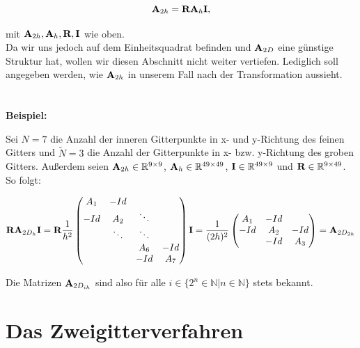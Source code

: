 \begin{equation}
{\textbf{A}}_{2h} = {\textbf{R}}{\textbf{A}}_{h}{\textbf{I}},
\end{equation}

mit ${\textbf{A}}_{2h},{\textbf{A}}_{h},{\textbf{R}},{\textbf{I}}$ wie oben.\\
Da wir uns jedoch auf dem Einheitsquadrat befinden und ${\textbf{A}}_{2D}$ eine günstige Struktur hat, wollen wir diesen Abschnitt nicht weiter vertiefen. Lediglich soll angegeben werden, wie ${\textbf{A}}_{2h}$ in unserem Fall nach der Transformation aussieht.
\\\\\\
\textbf{Beispiel:}

Sei $N = 7$ die Anzahl der inneren Gitterpunkte in x- und y-Richtung des feinen Gitters und $\tilde N = 3$ die Anzahl der Gitterpunkte in x- bzw. y-Richtung des groben Gitters. Außerdem seien ${\textbf{A}}_{2h} \in \mathbb{R}^{9 \times 9}$, ${\textbf{A}}_{h} \in \mathbb{R}^{49 \times 49}$, ${\textbf{I}} \in \mathbb{R}^{49 \times 9}$ und ${\textbf{R}} \in \mathbb{R}^{9 \times 49}$. So folgt:

\begin{equation}
{\textbf{R}}{\textbf{A}}_{2D_{h}}{\textbf{I}} = {\textbf{R}} \frac{1}{h^{2}}
\begin{pmatrix}
A_{1} & -Id \\
-Id & A_{2} & \ddots \\
 & \ddots & \ddots \\
 & & A_{6} & -Id\\
 & & -Id & A_{7}
\end{pmatrix}
{\textbf{I}} = \frac{1}{(2h)^{2}}
\begin{pmatrix}
A_{1} & -Id \\
-Id & A_{2} & -Id \\
 & -Id & A_{3}
\end{pmatrix}
= {\textbf{A}}_{2D_{2h}}
\end{equation}

Die Matrizen ${\textbf{A}}_{2D_{ih}}$ sind also für alle $i \in \{2^{n} \in \mathbb{N} | n \in \mathbb{N} \}$ stets bekannt.

\section{Das Zweigitterverfahren}\label{s.Der Zweigitter-Algorithmus}

